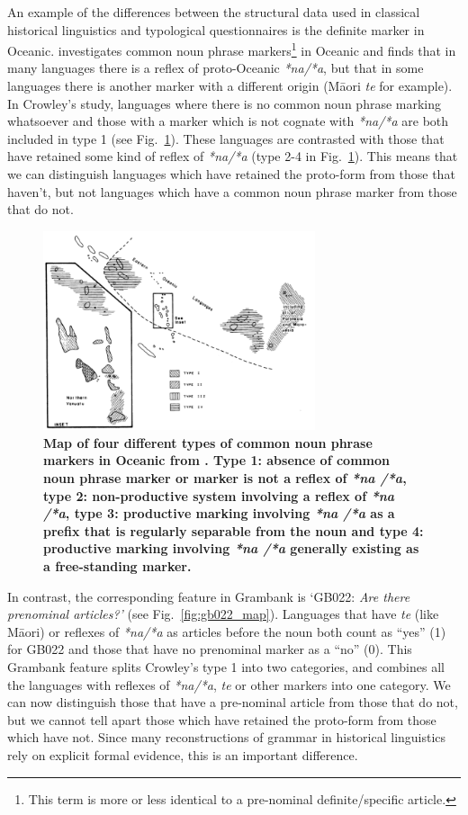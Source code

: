 \documentclass[draft,10pt]{article} %
\begin{document}
An example of the differences between the structural data used in classical historical linguistics and typological questionnaires is the definite marker in Oceanic. \citet{crowley1985common} investigates common noun phrase markers\footnote{This term is more or less identical to a pre-nominal definite/specific article.} in Oceanic and finds that in many languages there is a reflex of proto-Oceanic \emph{*na/*a}, but that in some languages there is another marker with a different origin (M\={a}ori \emph{te} for example). In Crowley's study, languages where there is no common noun phrase marking whatsoever and those with a marker which is not cognate with \emph{*na/*a} are both included in type 1 (see Fig.~\ref{fig:crowley_map}). These languages are contrasted with those that have retained some kind of reflex of \emph{*na/*a} (type 2-4 in Fig.~\ref{fig:crowley_map}). This means that we can distinguish languages which have retained the proto-form from those that haven't, but not languages which have a common noun phrase marker from those that do not.

\begin{figure}
\centering
\includegraphics[width=8cm]{illustrations/crowley_1985_map.png}
\caption[Map of four different types of common noun phrase markers in Oceanic from Crowley(1985).]{\textbf{Map of four different types of common noun phrase markers in Oceanic from \citet[162]{crowley1985common}. Type 1: absence of common noun phrase marker or marker is not a reflex of \emph{*na /*a}, type 2: non-productive system involving a reflex of \emph{*na /*a}, type 3: productive marking involving \emph{*na /*a} as a prefix that is regularly separable from the noun and type 4: productive marking involving \emph{*na /*a} generally existing as a free-standing marker.}}
\label{fig:crowley_map}
\end{figure}

In contrast, the corresponding feature in Grambank is `GB022: \emph{Are there prenominal articles?'} (see Fig.~\ref{fig:gb022_map}). Languages that have \emph{te} (like M\={a}ori) or reflexes of \emph{*na/*a} as articles before the noun both count as ``yes'' (1) for GB022 and those that have no prenominal marker as a ``no'' (0). This Grambank feature splits Crowley's type 1 into two categories, and combines all the languages with reflexes of \emph{*na/*a}, \emph{te} or other markers into one category. We can now distinguish those that have a pre-nominal article from those that do not, but we cannot tell apart those which have retained the proto-form from those which have not. Since many reconstructions of grammar in historical linguistics rely on explicit formal evidence, this is an important difference.
\end{document}
